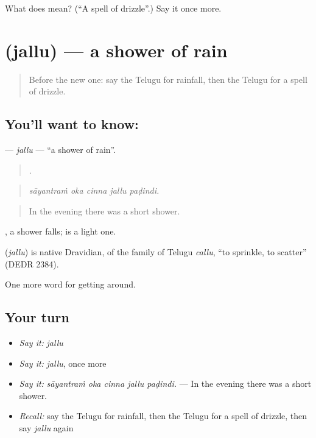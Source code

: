 \begin{tcolorbox}[breakable,colback=teal!4,colframe=teal!35!black,title={Before you move on}]
What does  mean? (\textquotedblleft{}A spell of drizzle\textquotedblright{}.) Say it once more.
\end{tcolorbox}
\section[\texorpdfstring{\te{జల్లు} (jallu)}{జల్లు (jallu)}]{ (jallu) — a shower of rain}

\label{lesson:TE-C477-jallu}



\begin{quote}
Before the new one: say the Telugu for rainfall, then the Telugu for a spell of drizzle.
\end{quote}

\subsection*{You'll want to know: }
\textbf{} — \emph{jallu} — \textquotedblleft{}a shower of rain\textquotedblright{}.

\begin{quote}
    .
\end{quote}

\begin{quote}
\emph{sāyantraṁ oka cinna jallu paḍindi.}
\end{quote}

\begin{quote}
In the evening there was a short shower.
\end{quote}

 , a shower falls;  is a light one.

\begin{cousinweb}
\textbf{} (\emph{jallu}) is native Dravidian, of the family of Telugu \emph{callu}, \textquotedblleft{}to sprinkle, to scatter\textquotedblright{} (DEDR 2384).
\end{cousinweb}

\begin{grammarlens}[title={What you've built}]
One more word for getting around.
\end{grammarlens}

\subsection*{Your turn}
\begin{itemize}
\raggedright
  \item \emph{Say it:} \emph{jallu}
  \item \emph{Say it:} \emph{jallu}, once more
  \item \emph{Say it:} \emph{sāyantraṁ oka cinna jallu paḍindi.} — In the evening there was a short shower.
  \item \emph{Recall:} say the Telugu for rainfall, then the Telugu for a spell of drizzle, then say \emph{jallu} again
\end{itemize}

